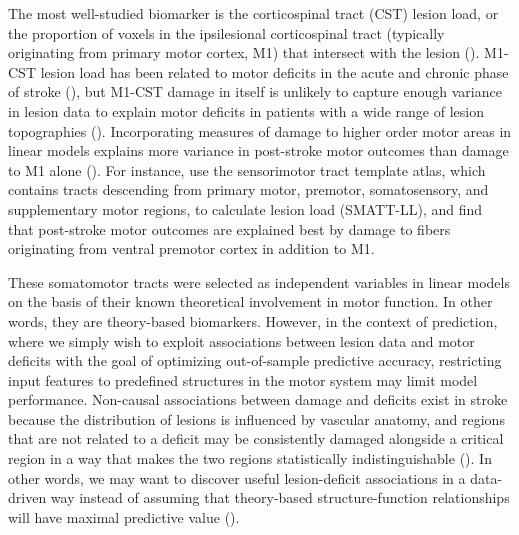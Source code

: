 \documentclass[phd,tocprelim]{cornell}
\begin{document}
The most well-studied biomarker is the corticospinal tract (CST) lesion load, or the proportion of voxels in the ipsilesional corticospinal tract (typically originating from primary motor cortex, M1) that intersect with the lesion (\cite{Zhu2010-qh, Feng2015-du, Findlater2019-je, Lam2018-xh, Pineiro2000-dv}). M1-CST lesion load has been related to motor deficits in the acute and chronic phase of stroke (\cite{Boyd2017-gs, Kim2017-xe}), but M1-CST damage in itself is unlikely to capture enough variance in lesion data to explain motor deficits in patients with a wide range of lesion topographies (\cite{Park2016-te,Findlater2019-je}). Incorporating measures of damage to higher order motor areas in linear models explains more variance in post-stroke motor outcomes than damage to M1 alone (\cite{Ito2022-em,  Rondina2016-ds, Rondina2017-ij, Schulz2012-yy, Park2016-te}). For instance, \cite{Ito2022-em} use the sensorimotor tract template atlas, which contains tracts descending from primary motor, premotor, somatosensory, and supplementary motor regions, to calculate lesion load (SMATT-LL), and find that post-stroke motor outcomes are explained best by damage to fibers originating from ventral premotor cortex in addition to M1.

These somatomotor tracts were selected as independent variables in linear models on the basis of their known theoretical involvement in motor function. In other words, they are theory-based biomarkers. However, in the context of prediction, where we simply wish to exploit associations between lesion data and motor deficits with the goal of optimizing out-of-sample predictive accuracy, restricting input features to predefined structures in the motor system may limit model performance. Non-causal associations between damage and deficits exist in stroke because the distribution of lesions is influenced by vascular anatomy, and regions that are not related to a deficit may be consistently damaged alongside a critical region in a way that makes the two regions statistically indistinguishable (\cite{Mah2014-cb}). In other words, we may want to discover useful lesion-deficit associations in a data-driven way instead of assuming that theory-based structure-function relationships will have maximal predictive value (\cite{Bzdok2020-py, Bonkhoff2022-op}).
\end{document}
